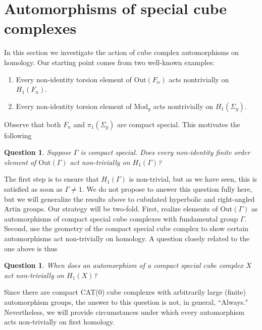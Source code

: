 \documentclass[11pt]{amsart}
\numberwithin{thm}{section}
\newtheorem{question}[thm]{Question}
\theoremstyle{remark}
\theoremstyle{definition}
\newcommand{\R}{\mathbb{R}}
\newcommand{\Z}{\mathbb{Z}}
\newcommand{\Out}{\text{Out}}
\newcommand{\Mod}{\text{Mod}}
\newcommand{\til}{\widetilde}
\begin{document}
%
%
%
%
%

\section{Automorphisms of special cube complexes}
In this section we investigate the action of cube complex automorphisms on homology.  Our starting point comes from two well-known examples:\begin{enumerate}
\item Every non-identity torsion element of $\Out(F_n)$ acts nontrivially on $H_1(F_n)$.
\item Every non-identity torsion element of $\Mod_g$ acts nontrivially on $H_1(\Sigma_g)$.
\end{enumerate}
Observe that both $F_n$ and $\pi_1(\Sigma_g)$ are compact special.  This motivates the following
\begin{question}\label{trivOut} Suppose $\Gamma$ is compact special.  Does every non-identity finite order element of $\Out(\Gamma)$ act non-trivially on $H_1(\Gamma)$?
\end{question}
The first step is to ensure that $H_1(\Gamma)$ is non-trivial, but as we have seen, this is satisfied as soon as $\Gamma\neq1$. We do not propose to answer this question fully here, but we will generalize the results above to cubulated hyperbolic and right-angled Artin groups.   Our strategy will be two-fold. First, realize elements of $\Out(\Gamma)$ as automorphisms of compact special cube complexes with fundamental group $\Gamma$.  Second, use the geometry of the compact special cube complex to show certain automorphisms act non-trivially on homology.  A question closely related to the one above is thus
\begin{question}When does an automorphism of a compact special cube complex $X$ act non-trivially on $H_1(X)$?  
\end{question}
Since there are compact CAT(0) cube complexes with arbitrarily large (finite) automorphism groups, the answer to this question is not, in general, ``Always." Nevertheless, we will provide circumstances under which every automorphism acts non-trivially on first homology.
\end{document}
